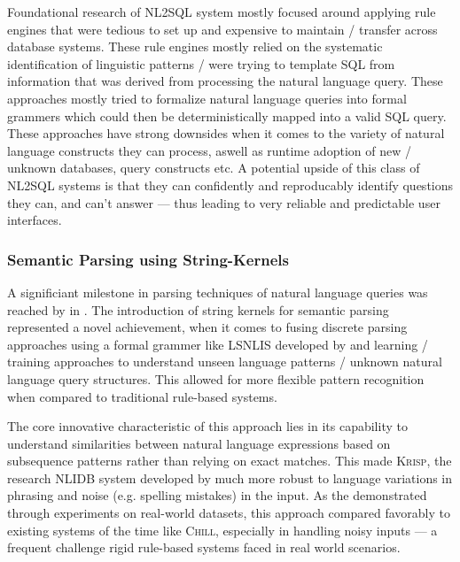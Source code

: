 \documentclass{article}
\begin{document}
Foundational research of NL2SQL system mostly focused around applying rule engines that were tedious to set up and expensive
to maintain / transfer across database systems. These rule engines mostly relied on the systematic identification
of linguistic patterns / were trying to template SQL from information that was derived from processing the natural
language query. \citep{Rendevouz, Lunar, Ladder} These approaches mostly tried to formalize natural language queries into 
formal grammers which could then be deterministically mapped into a valid SQL query. \citep{Lunar} These approaches have
strong downsides when it comes to the variety of natural language constructs they can process, aswell as runtime adoption of 
new / unknown databases, query constructs etc. A potential upside of this class of NL2SQL systems is that they can confidently 
and reproducably identify questions they can, and can't answer — thus leading to very reliable and predictable user interfaces.

\subsubsection{Semantic Parsing using String-Kernels}

A significiant milestone in parsing techniques of natural language queries was reached by \citeauthor*{StringKernels} in 
\citeyear{StringKernels}. The introduction of string kernels for semantic parsing represented a novel achievement, when 
it comes to fusing discrete parsing approaches using a formal grammer like LSNLIS developed by \cite{Lunar} and learning / 
training approaches to understand unseen language patterns / unknown natural language query structures. This allowed for more 
flexible pattern recognition when compared to traditional rule-based systems.

The core innovative characteristic of this approach lies in its capability to understand similarities between natural language 
expressions based on subsequence patterns rather than relying on exact matches. This made \textsc{Krisp}, the research NLIDB
system developed by \cite{StringKernels} much more robust to language variations in phrasing and noise (e.g. spelling mistakes) 
in the input. As the \citeauthor*{StringKernels} demonstrated through experiments on real-world datasets, this approach 
compared favorably to existing systems of the time like \textsc{Chill}, especially in handling noisy inputs — a frequent 
challenge rigid rule-based systems faced in real world scenarios. \citep{StringKernels, ILPParsing}
\end{document}
